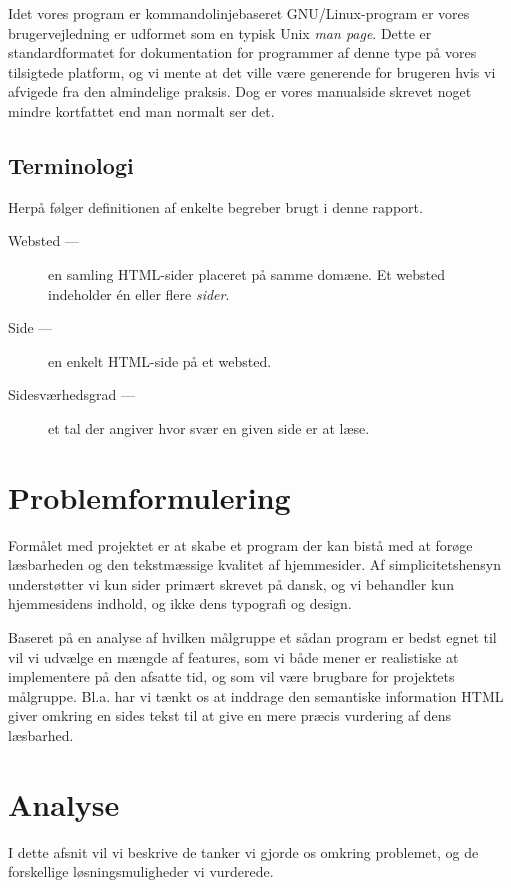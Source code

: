 \documentclass[a4paper,oneside]{memoir}
\begin{document}
Idet vores program er kommandolinjebaseret GNU/Linux-program er vores
brugervejledning er udformet som en typisk Unix \textit{man
  page}. Dette er standardformatet for dokumentation for programmer af
denne type på vores tilsigtede platform, og vi mente at det ville være
generende for brugeren hvis vi afvigede fra den almindelige
praksis. Dog er vores manualside skrevet noget mindre kortfattet end
man normalt ser det.

\section{Terminologi}

Herpå følger definitionen af enkelte begreber brugt i denne rapport.

\begin{description}
\item[Websted ---] en samling HTML-sider placeret på samme domæne. Et
  websted indeholder én eller flere \textit{sider}.
\item[Side ---] en enkelt HTML-side på et websted.
\item[Sidesværhedsgrad ---] et tal der angiver hvor svær en given side er
  at læse.
\end{description}

\chapter{Problemformulering}
\label{problemformulering}
Formålet med projektet er at skabe et program der kan bistå med at
forøge læsbarheden og den tekstmæssige kvalitet af hjemmesider. Af
simplicitetshensyn understøtter vi kun sider primært skrevet på dansk,
og vi behandler kun hjemmesidens indhold, og ikke dens typografi og
design.

Baseret på en analyse af hvilken målgruppe et sådan program er bedst
egnet til vil vi udvælge en mængde af features, som vi både mener er
realistiske at implementere på den afsatte tid, og som vil være
brugbare for projektets målgruppe. Bl.a. har vi tænkt os at inddrage
den semantiske information HTML giver omkring en sides tekst til at
give en mere præcis vurdering af dens læsbarhed.

\chapter{Analyse}
\label{analyse}
I dette afsnit vil vi beskrive de tanker vi gjorde os omkring
problemet, og de forskellige løsningsmuligheder vi vurderede.
\end{document}
